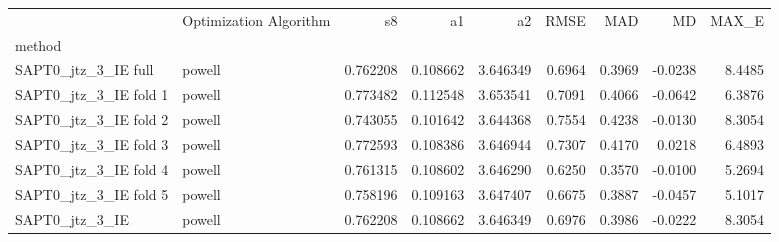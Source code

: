 \begin{tabular}{llrrrrrrr}
 & Optimization Algorithm & s8 & a1 & a2 & RMSE & MAD & MD & MAX_E \\
method &  &  &  &  &  &  &  &  \\
SAPT0_jtz_3_IE full & powell & 0.762208 & 0.108662 & 3.646349 & 0.6964 & 0.3969 & -0.0238 & 8.4485 \\
SAPT0_jtz_3_IE fold 1 & powell & 0.773482 & 0.112548 & 3.653541 & 0.7091 & 0.4066 & -0.0642 & 6.3876 \\
SAPT0_jtz_3_IE fold 2 & powell & 0.743055 & 0.101642 & 3.644368 & 0.7554 & 0.4238 & -0.0130 & 8.3054 \\
SAPT0_jtz_3_IE fold 3 & powell & 0.772593 & 0.108386 & 3.646944 & 0.7307 & 0.4170 & 0.0218 & 6.4893 \\
SAPT0_jtz_3_IE fold 4 & powell & 0.761315 & 0.108602 & 3.646290 & 0.6250 & 0.3570 & -0.0100 & 5.2694 \\
SAPT0_jtz_3_IE fold 5 & powell & 0.758196 & 0.109163 & 3.647407 & 0.6675 & 0.3887 & -0.0457 & 5.1017 \\
SAPT0_jtz_3_IE & powell & 0.762208 & 0.108662 & 3.646349 & 0.6976 & 0.3986 & -0.0222 & 8.3054 \\
\end{tabular}
